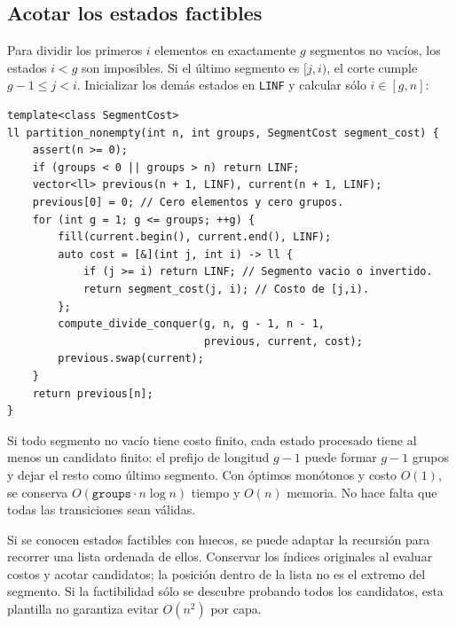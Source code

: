 
\subsection{Acotar los estados factibles}

Para dividir los primeros $i$ elementos en exactamente $g$ segmentos no
vacíos, los estados $i<g$ son imposibles. Si el último segmento es $[j,i)$,
el corte cumple $g-1\le j<i$. Inicializar los demás estados en
\texttt{LINF} y calcular sólo $i\in[g,n]$:

\begin{lstlisting}[style=cpp]
template<class SegmentCost>
ll partition_nonempty(int n, int groups, SegmentCost segment_cost) {
    assert(n >= 0);
    if (groups < 0 || groups > n) return LINF;
    vector<ll> previous(n + 1, LINF), current(n + 1, LINF);
    previous[0] = 0; // Cero elementos y cero grupos.
    for (int g = 1; g <= groups; ++g) {
        fill(current.begin(), current.end(), LINF);
        auto cost = [&](int j, int i) -> ll {
            if (j >= i) return LINF; // Segmento vacio o invertido.
            return segment_cost(j, i); // Costo de [j,i).
        };
        compute_divide_conquer(g, n, g - 1, n - 1,
                               previous, current, cost);
        previous.swap(current);
    }
    return previous[n];
}
\end{lstlisting}

Si todo segmento no vacío tiene costo finito, cada estado procesado tiene al
menos un candidato finito: el prefijo de longitud $g-1$ puede formar $g-1$
grupos y dejar el resto como último segmento. Con óptimos monótonos y costo
$O(1)$, se conserva $O(\texttt{groups}\cdot n\log n)$ tiempo y $O(n)$ memoria.
No hace falta que todas las transiciones sean válidas.


Si se conocen estados factibles con huecos, se puede adaptar la recursión
para recorrer una lista ordenada de ellos. Conservar los índices originales
al evaluar costos y acotar candidatos; la posición dentro de la lista no es
el extremo del segmento. Si la factibilidad sólo se descubre probando todos
los candidatos, esta plantilla no garantiza evitar $O(n^2)$ por capa.
